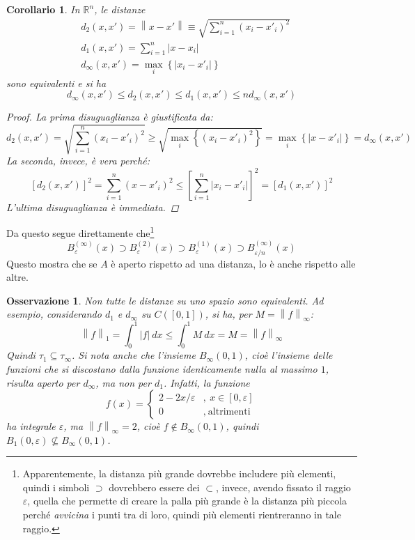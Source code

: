\documentclass[12pt]{scrartcl}
\theoremstyle{style}
\newtheorem{corollario}{Corollario}[teorema]
\newtheorem{osservazione}{Osservazione}[section]
\numberwithin{equation}{subsection}
\begin{document}
\begin{corollario}
In $\mathbb{R}^n$, le distanze 
\begin{equation}
	\begin{split}
		&d_2(x,x') = \left\lVert x-x' \right\rVert \equiv \sqrt{\sum_{i=1}^{n} (x_i-x'_i)^2} \\
		&d_1(x,x') = \sum_{i=1}^{n} \lvert x-x_i \rvert \\
		&d_{\infty}(x,x') = \max_{i} \left\{ \lvert x_i-x'_i \rvert  \right\} 
	\end{split}
\end{equation}
sono equivalenti e si ha
\begin{equation}
	d_{\infty} (x,x') \le d_2(x,x') \le d_1 (x,x') \le n d_\infty(x,x')
\end{equation}
\begin{proof}
	La prima disuguaglianza \`e giustificata da:
	\[
	d_2 (x,x') = \sqrt{\sum_{i=1}^{n} (x_i -x'_i)^2}  \ge \sqrt{\max_i  \left\{ (x_i-x'_i)^2 \right\} } = \max_i \left\{ \lvert x-x'_i \rvert  \right\} = d_\infty(x,x')
	\] 
	La seconda, invece, \`e vera perch\'e:
	\[
	\left[ d_2(x,x') \right] ^2 = \sum_{i=1}^{n} (x-x'_i)^2 \le \left[ \sum_{i=1}^{n} \lvert x_i-x'_i \rvert  \right] ^2 = \left[ d_1(x,x') \right]^2 
	\] 
L'ultima disuguaglianza \`e immediata.	
\end{proof}
\end{corollario}
\noindent Da questo segue direttamente che\footnote{Apparentemente, la distanza pi\`u grande dovrebbe includere pi\`u elementi, quindi i simboli $\supset$ dovrebbero essere dei $\subset$, invece, avendo fissato il raggio $\varepsilon $, quella che permette di creare la palla pi\`u grande \`e la distanza pi\`u piccola perch\'e \textit{avvicina} i punti tra di loro, quindi pi\`u elementi rientreranno in tale raggio.}
\begin{equation}
	B^{(\infty)} _\varepsilon (x) \supset B^{(2)} _\varepsilon (x) \supset B^{(1)} _{\varepsilon } (x) \supset B^{(\infty)} _{\varepsilon  / n} (x)
\end{equation}
Questo mostra che se $A$ \`e aperto rispetto ad una distanza, lo \`e anche rispetto alle altre.
\begin{osservazione}
Non tutte le distanze su uno spazio sono equivalenti. 
Ad esempio, considerando $d_1$ e $d_\infty$ su $C([0,1])$, si ha, per $M = \left\lVert f \right\rVert _\infty$:
\[
	\left\lVert f \right\rVert _1 = \int_{0} ^1 \lvert f \rvert\ d x \le  \int_{0} ^1 M \ dx = M = \left\lVert f \right\rVert _\infty
\] 
Quindi $\tau _1 \subseteq \tau _\infty$.
Si nota anche che l'insieme $B_\infty(0,1)$, cio\`e l'insieme delle funzioni che si discostano dalla funzione identicamente nulla al massimo $1$, risulta aperto per $d_\infty$, ma non per $d_1$.
Infatti, la funzione
\[
f(x) = \begin{cases}
	2 - 2x / \varepsilon &,\ x \in [0,\varepsilon ]\\
	0 &,\ \text{altrimenti}
\end{cases}
\] 
ha integrale $\varepsilon $, ma $\left\lVert f \right\rVert _\infty = 2$, cio\`e $f \not \in B_\infty(0,1)$, quindi $B_1(0,\varepsilon ) \not\subseteq B_\infty(0,1)$.
\end{osservazione}
\end{document}
